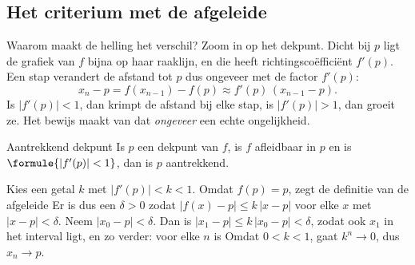 
\subsection{Het criterium met de afgeleide}

Waarom maakt de helling het verschil? Zoom in op het dekpunt. Dicht bij $p$ ligt de grafiek van $f$ bijna op haar raaklijn, en die heeft richtingscoëfficiënt $f'(p)$. Een stap verandert de afstand tot $p$ dus ongeveer met de factor $f'(p)$:
\[
x_n - p = f(x_{n-1}) - f(p) \approx f'(p)\,(x_{n-1} - p) .
\]
Is $|f'(p)| < 1$, dan krimpt de afstand bij elke stap, is $|f'(p)| > 1$, dan groeit ze. Het bewijs maakt van dat \textit{ongeveer} een echte ongelijkheid.

\begin{theorie}
\begin{stelling}{Aantrekkend dekpunt}
Is $p$ een dekpunt van $f$, is $f$ afleidbaar in $p$ en is $\formule{|f'(p)| < 1}$, dan is $p$ aantrekkend.
\end{stelling}

\begin{bewijs}
Kies een getal $k$ met $|f'(p)| < k < 1$. Omdat $f(p) = p$, zegt de definitie van de afgeleide
Er is dus een $\delta > 0$ zodat $|f(x) - p| \leqslant k\,|x - p|$ voor elke $x$ met $|x - p| < \delta$. Neem $|x_0 - p| < \delta$. Dan is $|x_1 - p| \leqslant k\,|x_0 - p| < \delta$, zodat ook $x_1$ in het interval ligt, en zo verder: voor elke $n$ is
Omdat $0 < k < 1$, gaat $k^n \to 0$, dus $x_n \to p$.
\end{bewijs}
\end{theorie}

